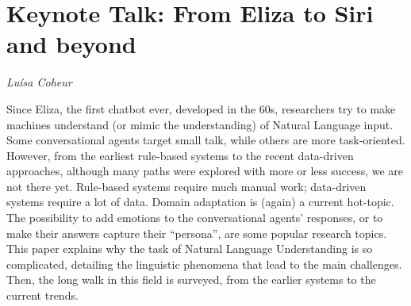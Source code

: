 \documentclass[../booklet.tex]{subfiles}
\begin{document}
\section[Keynote Talk: From Eliza to Siri and beyond. {\it Luísa Coheur}]{Keynote Talk: From Eliza to Siri and beyond}

\begin{center}
  {\it Luísa Coheur}
\end{center}

\vskip 0.8cm

Since Eliza, the first chatbot ever, developed in the 60s, researchers
try to make machines understand (or mimic the understanding) of
Natural Language input. Some conversational agents target small talk,
while others are more task-oriented. However, from the earliest
rule-based systems to the recent data-driven approaches, although many
paths were explored with more or less success, we are not there
yet. Rule-based systems require much manual work; data-driven systems
require a lot of data. Domain adaptation is (again) a current
hot-topic. The possibility to add emotions to the conversational
agents' responses, or to make their answers capture their ``persona'',
are some popular research topics.  This paper explains why the task of
Natural Language Understanding is so complicated, detailing the
linguistic phenomena that lead to the main challenges. Then, the long
walk in this field is surveyed, from the earlier systems to the
current trends.
\end{document}
